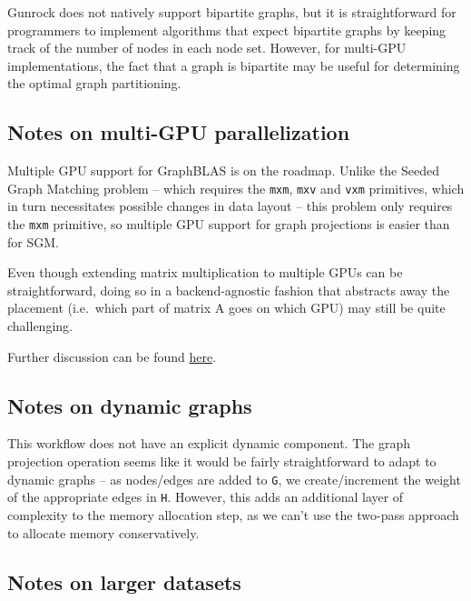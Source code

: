 \documentclass[10pt,oneside]{memoir}
\begin{document}
Gunrock does not natively support bipartite graphs, but it is
straightforward for programmers to implement algorithms that expect
bipartite graphs by keeping track of the number of nodes in each node
set. However, for multi-GPU implementations, the fact that a graph is
bipartite may be useful for determining the optimal graph partitioning.

\hypertarget{notes-on-multi-gpu-parallelization-6}{%
\subsection{Notes on multi-GPU
parallelization}\label{notes-on-multi-gpu-parallelization-6}}

Multiple GPU support for GraphBLAS is on the roadmap. Unlike the Seeded
Graph Matching problem -- which requires the \texttt{mxm}, \texttt{mxv}
and \texttt{vxm} primitives, which in turn necessitates possible changes
in data layout -- this problem only requires the \texttt{mxm} primitive,
so multiple GPU support for graph projections is easier than for SGM.

Even though extending matrix multiplication to multiple GPUs can be
straightforward, doing so in a backend-agnostic fashion that abstracts
away the placement (i.e.~which part of matrix A goes on which GPU) may
still be quite challenging.

Further discussion can be found
\href{https://gunrock.github.io/docs/hive_year1_summary.html\#scaling-analysis-for-hive-applications}{here}.

\hypertarget{notes-on-dynamic-graphs-6}{%
\subsection{Notes on dynamic graphs}\label{notes-on-dynamic-graphs-6}}

This workflow does not have an explicit dynamic component. The graph
projection operation seems like it would be fairly straightforward to
adapt to dynamic graphs -- as nodes/edges are added to \texttt{G}, we
create/increment the weight of the appropriate edges in \texttt{H}.
However, this adds an additional layer of complexity to the memory
allocation step, as we can't use the two-pass approach to allocate
memory conservatively.

\hypertarget{notes-on-larger-datasets-6}{%
\subsection{Notes on larger datasets}\label{notes-on-larger-datasets-6}}
\end{document}
